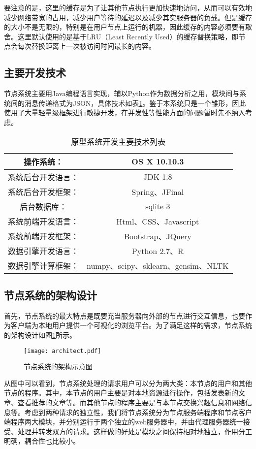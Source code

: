 要注意的是，这里的缓存是为了让其他节点执行更加快速地访问，从而可以有效地减少网络带宽的占用，减少用户等待的延迟以及减少其实服务器的负载。但是缓存的大小不是无限的，特别是在用户节点上运行的机器，因此缓存的内容必须要有取舍。这里默认使用的是基于LRU（Least Recently Used）的缓存替换策略，即节点会每次替换距离上一次被访问时间最长的内容。

\subsection{主要开发技术}
节点系统主要用Java编程语言实现，辅以Python作为数据分析之用，模块间与系统间的消息传递格式为JSON，具体技术如表\ref{tbl:tech}。鉴于本系统只是一个雏形，因此使用了大量轻量级框架进行敏捷开发，在并发性等性能方面的问题暂时先不纳入考虑。

\begin{table}[ht]
\centering
\caption{原型系统开发主要技术列表}
\begin{tabular}{|c|c|} 
\hline
操作系统：& OS X 10.10.3 \\
\hline
系统后台开发语言：& JDK 1.8 \\
\hline
系统后台开发框架：& Spring、JFinal \\
\hline
后台数据库：& sqlite 3 \\
\hline
系统前端开发语言：& Html、CSS、Javascript \\
\hline
系统前端开发框架：& Bootstrap、JQuery \\
\hline
数据引擎开发语言：& Python 2.7、R \\
\hline
数据引擎计算框架：& numpy、scipy、sklearn、gensim、NLTK \\
\hline
\end{tabular}
\label{tbl:tech}
\end{table}

\subsection{节点系统的架构设计}
首先，节点系统的最大特点是既要充当服务器向外部的节点进行交互信息，也要作为客户端为本地用户提供一个可视化的浏览平台。为了满足这样的需求，节点系统的架构设计如图\ref{fig:architect}所示。

\begin{figure}[!ht]
\centering
\texttt{[image: architect.pdf]}
\caption{节点系统的架构示意图}
\label{fig:architect}
\end{figure}

从图中可以看到，节点系统处理的请求用户可以分为两大类：本节点的用户和其他节点的程序。其中，本节点的用户主要是对本地资源进行操作，包括发表新的文章、查看推荐的文章等。而其他节点的程序主要是与本节点交换兴趣信息和网络信息等。考虑到两种请求的独立性，我们将节点系统分为节点服务端程序和节点客户端程序两大模块，并分别运行于两个独立的web服务器中，并由代理服务器统一接受、处理并转发双方的请求。这样做的好处是模块之间保持相对地独立，作用分工明确，耦合性也比较小。

